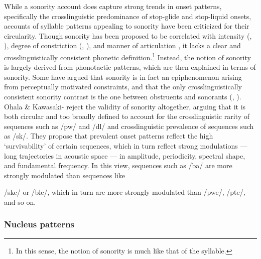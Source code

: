   While a sonority account does capture strong trends in onset patterns, specifically the crosslinguistic predominance of stop-glide and stop-liquid onsets, accounts of syllable patterns appealing to sonority have been criticized for their circularity. Though sonority has been proposed to be correlated with intensity (\citealt{Gordon2002}, \citealt{Parker2002}), degree of constriction (\citealt{Chin1996}, \citealt{Cser2003}), and manner of articulation \citep{Parker2011}, it lacks a clear and crosslinguistically consistent phonetic definition.\footnote{ \textrm{In this sense, the notion of sonority is much like that of the syllable.}} Instead, the notion of sonority is largely derived from phonotactic patterns, which are then explained in terms of sonority. Some have argued that sonority is in fact an epiphenomenon arising from perceptually motivated constraints, and that the only crosslinguistically consistent sonority contrast is the one between obstruents and sonorants (\citealt{JanyEtAl2007}, \citealt{HenkeEtAl2012}). Ohala \& Kawasaki-\citet{Fukumori1997} reject the validity of sonority altogether, arguing that it is both circular and too broadly defined to account for the crosslinguistic rarity of sequences such as /pw/ and /dl/ and crosslinguistic prevalence of sequences such as /sk/. They propose that prevalent onset patterns reflect the high ‘survivability’ of certain sequences, which in turn reflect strong modulations — long trajectories in acoustic space —  in amplitude, periodicity, spectral shape, and fundamental frequency. In this view, sequences such as /ba/ are more strongly modulated than sequences like 

/ske/ or /ble/, which in turn are more strongly modulated than /pwe/, /pte/, and so on.

\subsubsection{{Nucleus} {patterns}}\label{sec:1.1.2.4}


